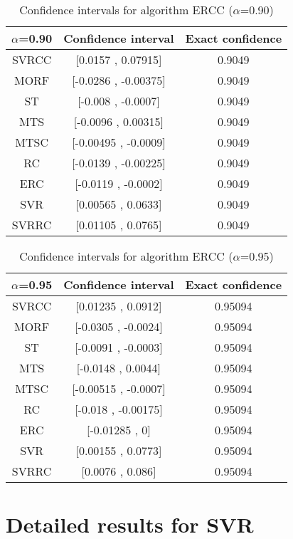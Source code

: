 \documentclass[a4paper,10pt]{article}
\begin{document}
\begin{table}[!htp]
\centering\small
\begin{tabular}{
|c|c|c|}
\hline
 $\alpha$=0.90 & Confidence interval & Exact confidence \\ \hline 
SVRCC & [0.0157 , 0.07915] & 0.9049\\ \hline 
MORF & [-0.0286 , -0.00375] & 0.9049\\ \hline 
ST & [-0.008 , -0.0007] & 0.9049\\ \hline 
MTS & [-0.0096 , 0.00315] & 0.9049\\ \hline 
MTSC & [-0.00495 , -0.0009] & 0.9049\\ \hline 
RC & [-0.0139 , -0.00225] & 0.9049\\ \hline 
ERC & [-0.0119 , -0.0002] & 0.9049\\ \hline 
SVR & [0.00565 , 0.0633] & 0.9049\\ \hline 
SVRRC & [0.01105 , 0.0765] & 0.9049\\ \hline 

\end{tabular}
\caption{Confidence intervals for algorithm ERCC ($\alpha$=0.90)}
\end{table}
\begin{table}[!htp]
\centering\small
\begin{tabular}{
|c|c|c|}
\hline
 $\alpha$=0.95 & Confidence interval & Exact confidence \\ \hline 
SVRCC & [0.01235 , 0.0912] & 0.95094\\ \hline 
MORF & [-0.0305 , -0.0024] & 0.95094\\ \hline 
ST & [-0.0091 , -0.0003] & 0.95094\\ \hline 
MTS & [-0.0148 , 0.0044] & 0.95094\\ \hline 
MTSC & [-0.00515 , -0.0007] & 0.95094\\ \hline 
RC & [-0.018 , -0.00175] & 0.95094\\ \hline 
ERC & [-0.01285 , 0] & 0.95094\\ \hline 
SVR & [0.00155 , 0.0773] & 0.95094\\ \hline 
SVRRC & [0.0076 , 0.086] & 0.95094\\ \hline 

\end{tabular}
\caption{Confidence intervals for algorithm ERCC ($\alpha$=0.95)}
\end{table}

 \clearpage 


\section{Detailed results for SVR}
\end{document}
